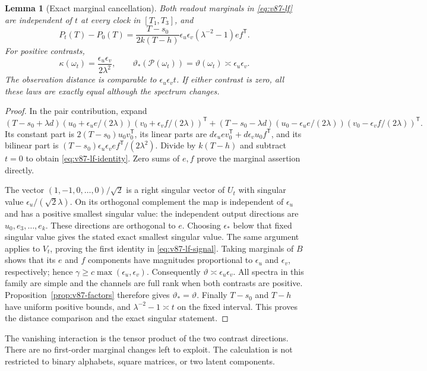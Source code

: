 \documentclass[11pt,reqno]{amsart}
\numberwithin{equation}{section}
\newtheorem{lemma}[theorem]{Lemma}
\theoremstyle{definition}\newtheorem{definition}[theorem]{Definition}
\theoremstyle{remark}\newtheorem{remark}[theorem]{Remark}
\newcommand{\sig}{\vartheta}
\begin{document}
\begin{lemma}[Exact marginal cancellation]\label{lem:v87-lf}
Both readout marginals in \eqref{eq:v87-lf} are independent of $t$
at every clock in $[T_1,T_3]$, and
\begin{equation}\label{eq:v87-lf-identity}
 P_t(T)-P_0(T)=
 \frac{T-s_0}{2k(T-h)}\epsilon_u\epsilon_v(\lambda^{-2}-1)ef^{\mathsf T}.
\end{equation}
For positive contrasts,
\begin{equation}\label{eq:v87-lf-signal}
 \kappa(\omega_t)=\frac{\epsilon_u\epsilon_v}{2\lambda^2},
 \qquad \sig_*(\mathcal P(\omega_t))
            =\sig(\omega_t)\asymp\epsilon_u\epsilon_v.
\end{equation}
The observation distance is comparable to
$\epsilon_u\epsilon_v t$. If either contrast is zero, all these
laws are exactly equal although the spectrum changes.
\end{lemma}
\begin{proof}
In the pair contribution, expand
\[
 (T-s_0+\lambda d)
    (u_0+\epsilon_u e/(2\lambda))(v_0+\epsilon_v f/(2\lambda))^{\mathsf T}
 +(T-s_0-\lambda d)
    (u_0-\epsilon_u e/(2\lambda))(v_0-\epsilon_v f/(2\lambda))^{\mathsf T}.
\]
Its constant part is $2(T-s_0)u_0v_0^{\mathsf T}$, its linear parts
are $d\epsilon_u ev_0^{\mathsf T}+d\epsilon_v u_0f^{\mathsf T}$,
and its bilinear part is
$(T-s_0)\epsilon_u\epsilon_v ef^{\mathsf T}/(2\lambda^2)$.
Divide by $k(T-h)$ and subtract $t=0$ to obtain
\eqref{eq:v87-lf-identity}. Zero sums of $e,f$ prove the marginal
assertion directly.

The vector $(1,-1,0,\ldots,0)/\sqrt2$ is a right singular vector
of $U_t$ with singular value $\epsilon_u/(\sqrt2\lambda)$.
On its orthogonal complement the map is independent of $\epsilon_u$
and has a positive smallest singular value: the independent output
directions are $u_0,e_3,\ldots,e_k$. These directions are orthogonal
to $e$. Choosing $\epsilon_*$ below that fixed singular value gives
the stated exact smallest singular value. The same argument applies
to $V_t$, proving the first identity in \eqref{eq:v87-lf-signal}.
Taking marginals of $B$ shows that its $e$ and $f$ components have
magnitudes proportional to $\epsilon_u$ and $\epsilon_v$,
respectively; hence $\gamma\ge c\max(\epsilon_u,\epsilon_v)$.
Consequently $\sig\asymp\epsilon_u\epsilon_v$.
All spectra in this family are simple and the channels are full rank
when both contrasts are positive. Proposition~\ref{prop:v87-factors}
therefore gives $\sig_* = \sig$.
Finally $T-s_0$ and $T-h$ have uniform positive bounds, and
$\lambda^{-2}-1\asymp t$ on the fixed interval. This proves the
distance comparison and the exact singular statement.
\end{proof}
The vanishing interaction is the tensor product of the two contrast
directions. There are no first-order marginal changes left to exploit.
The calculation is not restricted to binary alphabets, square matrices,
or two latent components.
\end{document}
